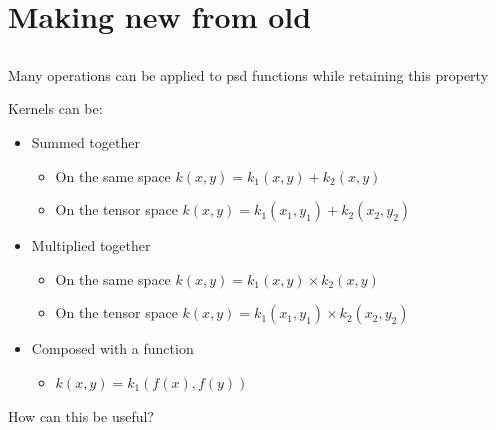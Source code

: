 \documentclass{beamer}
\begin{document}
\section{Making new from old}
\subsection{}

\begin{frame}{}
Many operations can be applied to psd functions while retaining this property
\begin{block}{}
Kernels can be:
\begin{itemize}
  \item Summed together
  \begin{itemize}
    \item On the same space $k(x,y) = k_1(x,y) + k_2(x,y)$
    \item On the tensor space $k(x,y) = k_1(x_1,y_1) + k_2(x_2,y_2)$
  \end{itemize} 
  \item Multiplied together
  \begin{itemize}
    \item On the same space $k(x,y) = k_1(x,y) \times k_2(x,y)$
    \item On the tensor space $k(x,y) = k_1(x_1,y_1) \times k_2(x_2,y_2)$
  \end{itemize} 
  \item Composed with a function
  \begin{itemize}
    \item $k(x,y) = k_1(f(x),f(y))$
  \end{itemize} 
\end{itemize} 
\end{block}
\begin{center}
\alert{How can this be useful?}
\end{center}
\end{frame}

\end{document}
